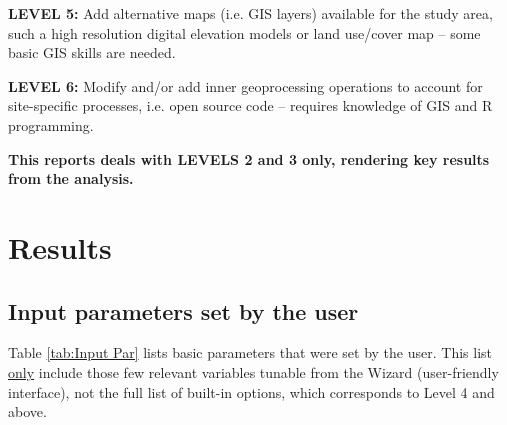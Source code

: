 \documentclass[english,a4paper,11pt,twoside]{report}
\begin{document}
\textbf{LEVEL 5:} Add alternative maps (i.e. GIS layers) available for the study area, such a high resolution digital elevation models or land use/cover map – some basic GIS skills are needed. 

\textbf{LEVEL 6:} Modify and/or add inner geoprocessing operations to account for site-specific processes, i.e. open source code – requires knowledge of GIS and R programming.\bigskip

\textbf{This reports deals with LEVELS 2 and 3 only, rendering key results from the analysis.}

\chapter{Results} \label{ch:Results}
\section{Input parameters set by the user} \label{sec:Input Par}
Table \ref{tab:Input Par} lists basic parameters that were set by the user. This list \underline{only} include those few relevant variables tunable from the Wizard (user-friendly interface), not the full list of built-in options, which corresponds to Level 4 and above.
\end{document}
